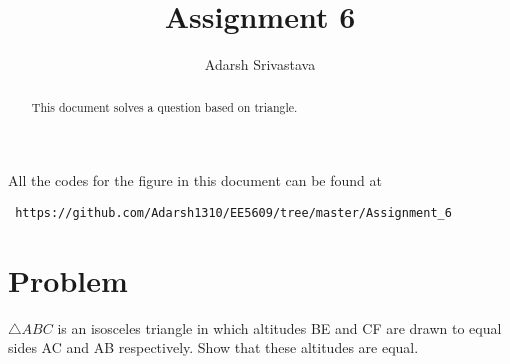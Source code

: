 \documentclass[journal,12pt,twocolumn]{IEEEtran}
\begin{document}
 \makeatletter
 \makeatother
 \let\StandardTheFigure\thefigure
 \let\vec\mathbf
 \renewcommand{\thefigure}{\theproblem}
 \def\putbox#1#2#3{\makebox[0in][l]{\makebox[#1][l]{}\raisebox{\baselineskip}[0in][0in]{\raisebox{#2}[0in][0in]{#3}}}}
      \def\rightbox#1{\makebox[0in][r]{#1}}
      \def\centbox#1{\makebox[0in]{#1}}
      \def\topbox#1{\raisebox{-\baselineskip}[0in][0in]{#1}}
      \def\midbox#1{\raisebox{-0.5\baselineskip}[0in][0in]{#1}}
 \vspace{3cm}
 \title{Assignment 6}
 \author{Adarsh Srivastava}
 \maketitle
 \newpage
 \bigskip
 \renewcommand{\thefigure}{\theenumi}
 \renewcommand{\thetable}{\theenumi}
 \begin{abstract}
 This document solves a question based on triangle.
 \end{abstract}
 All the codes for the figure in this document can be found at
 \begin{lstlisting}
 https://github.com/Adarsh1310/EE5609/tree/master/Assignment_6
 \end{lstlisting}
 \section{Problem}
 $\triangle{ABC}$ is an isosceles triangle in which altitudes BE and CF are drawn to equal sides AC and AB respectively. Show that these altitudes are equal.
\end{document}
